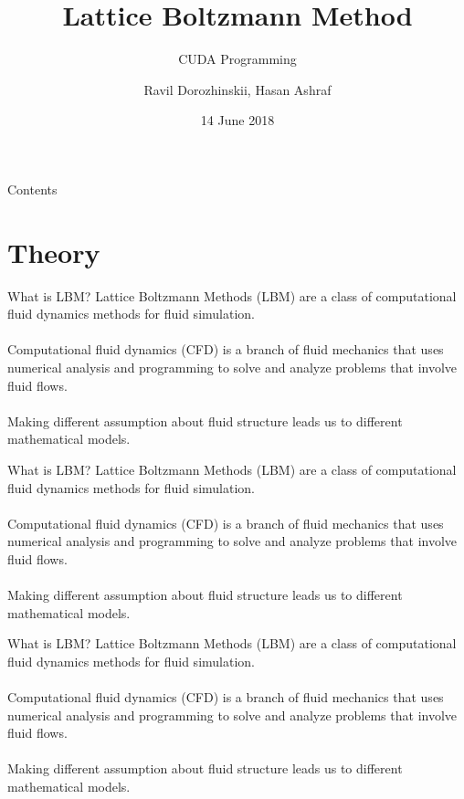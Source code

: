 \documentclass[9pt]{beamer}
\title[CUDA LBM Solver]{Lattice Boltzmann Method}
\subtitle{CUDA Programming}
\author{Ravil Dorozhinskii, Hasan Ashraf}
\institute[TUM] {
	Computational Science and Engineering
}
\date{14 June 2018}
\begin{document}
\begin{frame}
  \titlepage
\end{frame}

\begin{frame}{Contents}
  \tableofcontents
\end{frame}
\section{Theory}

\begin{frame}[t]{What is LBM?}
Lattice Boltzmann Methods (LBM) are a class of computational fluid dynamics methods for fluid simulation. \cite{lattice_boltzmann_wiki} \\~\\

{\color{gray}
Computational fluid dynamics (CFD) is a branch of fluid mechanics that uses numerical analysis and programming to solve and analyze problems that involve fluid flows.} \\~\\

{\color{gray} Making different assumption about fluid structure leads us to different mathematical models.
}
\end{frame}

\begin{frame}[t]{What is LBM?}
Lattice Boltzmann Methods (LBM) are a class of computational fluid dynamics methods for fluid simulation. \cite{lattice_boltzmann_wiki}\\~\\


Computational fluid dynamics (CFD) is a branch of fluid mechanics that uses numerical analysis and programming to solve and analyze problems that involve fluid flows. \\~\\

{\color{gray} Making different assumption about fluid structure leads us to different mathematical models.
}
\end{frame}

\begin{frame}[t]{What is LBM?}
Lattice Boltzmann Methods (LBM) are a class of computational fluid dynamics methods for fluid simulation. \cite{lattice_boltzmann_wiki} \\~\\


Computational fluid dynamics (CFD) is a branch of fluid mechanics that uses numerical analysis and programming to solve and analyze problems that involve fluid flows. \\~\\

Making different assumption about fluid structure leads us to different mathematical models.
\end{frame}
\end{document}
